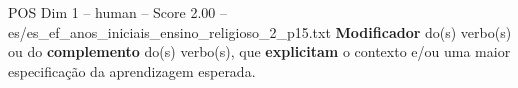 \begin{textsample}{POS Dim 1 – human – Score 2.00 – es/es\_ef\_anos\_iniciais\_ensino\_religioso\_2\_p15.txt}  \label{ex:f1_pos_008}
\textbf{Modificador} do(s) verbo(s) ou do \textbf{complemento} do(s) verbo(s), que \textbf{explicitam} o contexto e/ou uma maior especificação da aprendizagem esperada.

\end{textsample}
